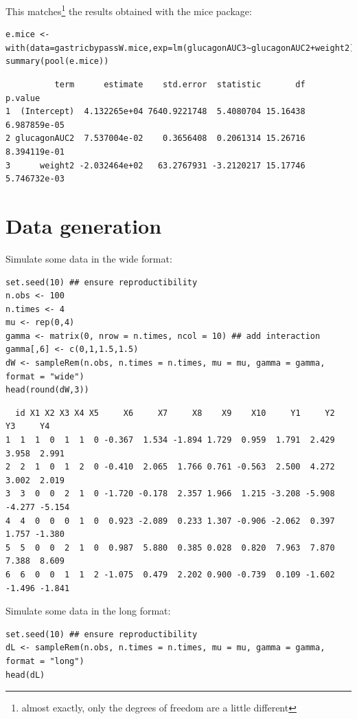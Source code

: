 \documentclass[12pt]{article}
\begin{document}
This matches\footnote{almost exactly, only the degrees of freedom are a
little different} the results obtained with the mice package:
\lstset{language=r,label= ,caption= ,captionpos=b,numbers=none}
\begin{lstlisting}
e.mice <- with(data=gastricbypassW.mice,exp=lm(glucagonAUC3~glucagonAUC2+weight2))
summary(pool(e.mice))
\end{lstlisting}

\begin{verbatim}
          term      estimate    std.error  statistic       df      p.value
1  (Intercept)  4.132265e+04 7640.9221748  5.4080704 15.16438 6.987859e-05
2 glucagonAUC2  7.537004e-02    0.3656408  0.2061314 15.26716 8.394119e-01
3      weight2 -2.032464e+02   63.2767931 -3.2120217 15.17746 5.746732e-03
\end{verbatim}



\clearpage

\section{Data generation}
\label{sec:orgcd42d0e}
Simulate some data in the wide format:
\lstset{language=r,label= ,caption= ,captionpos=b,numbers=none}
\begin{lstlisting}
set.seed(10) ## ensure reproductibility
n.obs <- 100
n.times <- 4
mu <- rep(0,4)
gamma <- matrix(0, nrow = n.times, ncol = 10) ## add interaction
gamma[,6] <- c(0,1,1.5,1.5)
dW <- sampleRem(n.obs, n.times = n.times, mu = mu, gamma = gamma, format = "wide")
head(round(dW,3))
\end{lstlisting}

\begin{verbatim}
  id X1 X2 X3 X4 X5     X6     X7     X8    X9    X10     Y1     Y2     Y3     Y4
1  1  1  0  1  1  0 -0.367  1.534 -1.894 1.729  0.959  1.791  2.429  3.958  2.991
2  2  1  0  1  2  0 -0.410  2.065  1.766 0.761 -0.563  2.500  4.272  3.002  2.019
3  3  0  0  2  1  0 -1.720 -0.178  2.357 1.966  1.215 -3.208 -5.908 -4.277 -5.154
4  4  0  0  0  1  0  0.923 -2.089  0.233 1.307 -0.906 -2.062  0.397  1.757 -1.380
5  5  0  0  2  1  0  0.987  5.880  0.385 0.028  0.820  7.963  7.870  7.388  8.609
6  6  0  0  1  1  2 -1.075  0.479  2.202 0.900 -0.739  0.109 -1.602 -1.496 -1.841
\end{verbatim}


Simulate some data in the long format:
\lstset{language=r,label= ,caption= ,captionpos=b,numbers=none}
\begin{lstlisting}
set.seed(10) ## ensure reproductibility
dL <- sampleRem(n.obs, n.times = n.times, mu = mu, gamma = gamma, format = "long")
head(dL)
\end{lstlisting}
\end{document}
